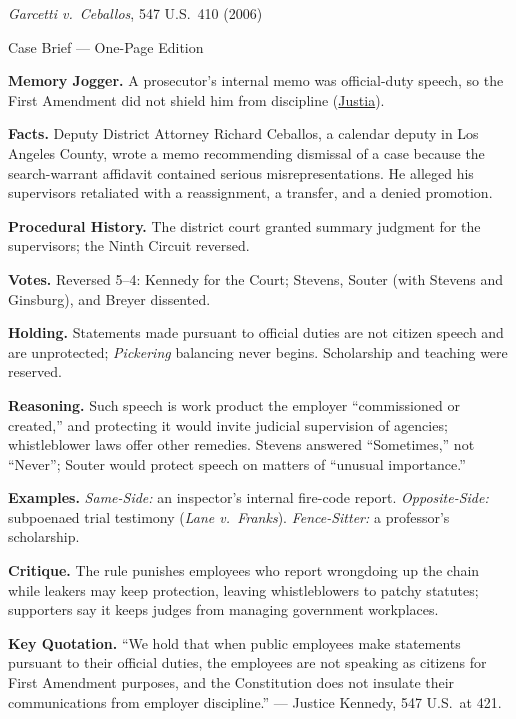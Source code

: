 \documentclass[12pt]{article}
\begin{document}
\begin{center}
{\Large \textit{Garcetti v.\ Ceballos}, 547 U.S.\ 410 (2006)\par}
\vspace{0.3em}
{\normalsize Case Brief --- One-Page Edition\par}
\end{center}

\textbf{Memory Jogger.} A prosecutor's internal memo was official-duty speech, so the First Amendment did not shield him from discipline (\href{https://supreme.justia.com/cases/federal/us/547/410/}{Justia}).

\textbf{Facts.} Deputy District Attorney Richard Ceballos, a calendar deputy in Los Angeles County, wrote a memo recommending dismissal of a case because the search-warrant affidavit contained serious misrepresentations. He alleged his supervisors retaliated with a reassignment, a transfer, and a denied promotion.

\textbf{Procedural History.} The district court granted summary judgment for the supervisors; the Ninth Circuit reversed.

\textbf{Votes.} Reversed 5--4: Kennedy for the Court; Stevens, Souter (with Stevens and Ginsburg), and Breyer dissented.

\textbf{Holding.} Statements made pursuant to official duties are not citizen speech and are unprotected; \textit{Pickering} balancing never begins. Scholarship and teaching were reserved.

\textbf{Reasoning.} Such speech is work product the employer ``commissioned or created,'' and protecting it would invite judicial supervision of agencies; whistleblower laws offer other remedies. Stevens answered ``Sometimes,'' not ``Never''; Souter would protect speech on matters of ``unusual importance.''

\textbf{Examples.} \emph{Same-Side:} an inspector's internal fire-code report. \emph{Opposite-Side:} subpoenaed trial testimony (\textit{Lane v.\ Franks}). \emph{Fence-Sitter:} a professor's scholarship.

\textbf{Critique.} The rule punishes employees who report wrongdoing up the chain while leakers may keep protection, leaving whistleblowers to patchy statutes; supporters say it keeps judges from managing government workplaces.

\textbf{Key Quotation.} ``We hold that when public employees make statements pursuant to their official duties, the employees are not speaking as citizens for First Amendment purposes, and the Constitution does not insulate their communications from employer discipline.'' --- Justice Kennedy, 547 U.S.\ at 421.
\end{document}
